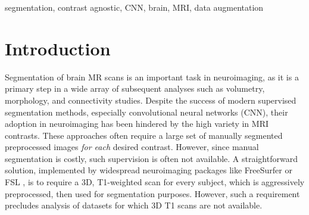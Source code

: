 \documentclass{midl}
\newcommand{\netname}{SynthSeg}
\begin{document}
\begin{abstract}
We present a deep learning strategy that enables, for the first time, contrast-agnostic semantic segmentation of completely unpreprocessed  brain MRI scans, without requiring additional training or fine-tuning for new modalities. 
Classical Bayesian methods address this segmentation problem with unsupervised intensity models, but require significant computational resources. In contrast, learning-based methods can be fast at test time, but are sensitive to the data available at training. Our proposed learning method, \netname{}, leverages a set of training segmentations (no intensity images required) to generate synthetic scans of widely varying contrasts on the fly during training. These scans are produced using the generative model of the classical Bayesian segmentation framework, with randomly sampled parameters for appearance, deformation, noise, and bias field. Because each mini-batch has a different synthetic contrast, the final network is not biased towards any MRI contrast.
We comprehensively evaluate our approach on four datasets comprising over 1,000 subjects and four MR contrasts. The results show that our approach successfully segments every contrast in the data, performing slightly better than classical Bayesian segmentation, and three orders of magnitude faster. Moreover, even within the same type of MRI contrast, our strategy generalizes significantly better across datasets, compared to training using real images. Finally, we find that synthesizing a broad range of contrasts, even if unrealistic, increases the generalization of the neural network. Our code and model are open source at~\url{https://github.com/BBillot/\netname}.
\end{abstract}

\begin{keywords}
segmentation, contrast agnostic, CNN, brain, MRI, data augmentation
\end{keywords}




\section{Introduction}

Segmentation of brain MR scans is an important task in neuroimaging, as it is a primary step in a wide array of subsequent analyses such as volumetry, morphology, and connectivity studies. Despite the success of modern supervised segmentation methods, especially convolutional neural networks (CNN), their adoption in neuroimaging has been hindered by the high variety in MRI contrasts. These approaches often require a large set of manually segmented preprocessed images \textit{for each} desired contrast. However, since manual segmentation is costly, such supervision is often not available.  A straightforward solution, implemented by widespread neuroimaging packages like FreeSurfer \cite{fischl_freesurfer_2012} or FSL \cite{jenkinson_fsl_2012}, is to require a 3D, T1-weighted scan for every subject, which is aggressively preprocessed, then used for segmentation purposes. However, such a requirement precludes analysis of datasets for which 3D T1 scans are not available.
\end{document}
